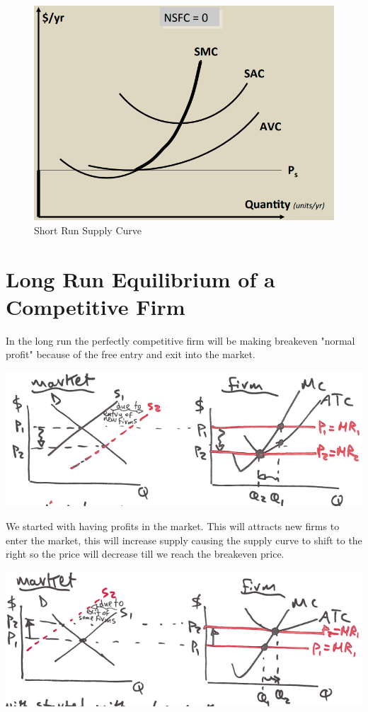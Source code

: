 \documentclass[../ECON-281-Notes.tex]{subfiles}
\begin{document}
\begin{figure}[!h]
  \centering
  \includegraphics[width=\columnwidth]{assets/image-2021-12-11-12-07-15.png}
  \caption{Short Run Supply Curve}
  \label{fig:SR_supply_curve}
\end{figure}

\section{Long Run Equilibrium of a Competitive Firm}
In the long run the perfectly competitive firm will be making breakeven "normal profit" because of the free entry and exit into the market. 

\includegraphics[width=\columnwidth]{assets/image-2021-12-11-12-10-51.png}

We started with having profits in the market. This will attracts new firms to enter the market, this will increase supply causing the supply curve to shift to the right so the price will decrease till we reach the breakeven price.

\includegraphics[width=\columnwidth]{assets/image-2021-12-11-12-11-09.png}
\end{document}
